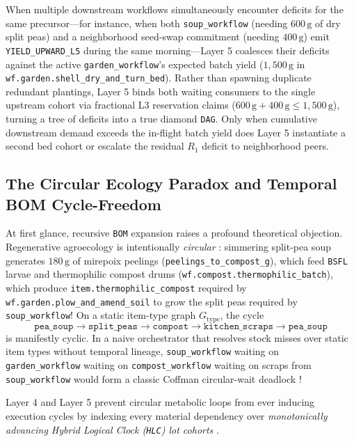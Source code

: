 When multiple downstream workflows simultaneously encounter deficits for the same precursor---for
instance, when both \texttt{soup\_workflow} (needing $600\,\mathrm{g}$ of dry split peas) and a
neighborhood seed-swap commitment (needing $400\,\mathrm{g}$) emit \texttt{YIELD\_UPWARD\_L5} during the
same morning---Layer 5 coalesces their deficits against the active \texttt{garden\_workflow}'s expected
batch yield ($1{,}500\,\mathrm{g}$ in \texttt{wf.garden.shell\_dry\_and\_turn\_bed}). Rather than spawning
duplicate redundant plantings, Layer 5 binds both waiting consumers to the single upstream cohort via
fractional L3 reservation claims ($600\,\mathrm{g} + 400\,\mathrm{g} \le 1{,}500\,\mathrm{g}$), turning a
tree of deficits into a true diamond \texttt{DAG}. Only when cumulative downstream demand exceeds the
in-flight batch yield does Layer 5 instantiate a second bed cohort or escalate the residual $R_1$ deficit
to neighborhood peers.

\subsection{The Circular Ecology Paradox and Temporal BOM Cycle-Freedom}

At first glance, recursive \texttt{BOM} expansion raises a profound theoretical objection. Regenerative
agroecology is intentionally \emph{circular} \parencite{odum1971,georgescu1971}: simmering split-pea soup
generates $180\,\mathrm{g}$ of mirepoix peelings (\texttt{peelings\_to\_compost\_g}), which feed
\texttt{BSFL} larvae and thermophilic compost drums (\texttt{wf.compost.thermophilic\_batch}), which
produce \texttt{item.thermophilic\_compost} required by \texttt{wf.garden.plow\_and\_amend\_soil} to grow
the split peas required by \texttt{soup\_workflow}! On a static item-type graph $G_{\mathrm{type}}$, the
cycle
\[
\texttt{pea\_soup} \longrightarrow \texttt{split\_peas} \longrightarrow \texttt{compost} \longrightarrow \texttt{kitchen\_scraps} \longrightarrow \texttt{pea\_soup}
\]
is manifestly cyclic. In a naive orchestrator that resolves stock misses over static item types without
temporal lineage, \texttt{soup\_workflow} waiting on \texttt{garden\_workflow} waiting on
\texttt{compost\_workflow} waiting on scraps from \texttt{soup\_workflow} would form a classic Coffman
circular-wait deadlock \parencite{coffman1971deadlocks}!

Layer 4 and Layer 5 prevent circular metabolic loops from ever inducing execution cycles by indexing every
material dependency over \emph{monotonically advancing Hybrid Logical Clock (\texttt{HLC}) lot cohorts}
\parencite{lamport1978time,kulkarni2014logical}.

